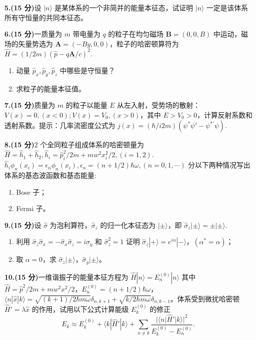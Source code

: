 \textbf{5.(15 分)}设 $|n\rangle$ 是某体系的一个非简并的能量本征态，试证明 $|n\rangle$ 一定是该体系所有守恒量的共同本征态。

\textbf{6.(15 分)}一质量为 $m$ 带电量为 $q$ 的粒子在均匀磁场 $\mathbf{B} = (0,0,B)$ 中运动，磁场的矢量势选为 $\mathbf{A} = (-By,0,0)$，粒子的哈密顿算符为 $\hat{H} = (1/2m)(\hat{p} - q\mathbf{A}/c)^2$.
    \begin{enumerate}
        \item 动量 $\hat{p}_x, \hat{p}_y, \hat{p}_z$ 中哪些是守恒量？
        \item 求粒子的能量本征值。
    \end{enumerate}

\textbf{7.(15 分)}质量为 $m$ 的粒子以能量 $E$ 从左入射，受势场的散射：$V(x) = 0, (x < 0); V(x) = V_0, (x > 0)$，其中 $E > V_0 > 0$，计算反射系数和透射系数。提示：几率流密度公式为 $j(x) = (\hbar/i2m)(\psi^*\psi' - \psi^{*'}\psi)$.

\textbf{8.(15 分)}2 个全同粒子组成体系的哈密顿量为 $\hat{H} = \hat{h}_1 + \hat{h}_2, \hat{h}_i = \hat{p}_i^2/2m + mw^2 x_i^2/2, (i = 1,2)$. $\hat{h}_i \phi_n(x_i) = \epsilon_n \phi_n(x_i), \epsilon_n = (n + 1/2)\hbar \omega, (n = 0,1,\cdots)$ 分以下两种情况写出体系的基态波函数和基态能量: 
    \begin{enumerate}
        \item  Bose 子；
        \item  Fermi 子。
    \end{enumerate}

 \textbf{9.(15 分)}设 $\hat{\sigma}$ 为泡利算符，$\hat{\sigma}_z$ 的归一化本征态为 $| \pm \rangle$，即 $\hat{\sigma}_z | \pm \rangle = \pm | \pm\rangle$.
    \begin{enumerate}
        \item 利用 $\hat{\sigma}_z \hat{\sigma}_x = -\hat{\sigma}_x \hat{\sigma}_z = i \hat{\sigma}_y$ 和 $\hat{\sigma}_z^2 = 1$ 证明 $\hat{\sigma}_z | + \rangle = e^{i \alpha} | - \rangle$，$(\alpha^* = \alpha)$；
        \item 取 $\alpha = 0$，求 $\hat{\sigma}_z | \pm \rangle$，$\hat{\sigma}_y | \pm \rangle$。
    \end{enumerate}   

 \textbf{10.(15 分)}一维谐振子的能量本征方程为 $\hat{H}|n\rangle = E_n^{(0)} |n\rangle$ 其中 $\hat{H} = \hat{p}^2/2m + mw^2 x^2 / 2$，$E_n^{(0)} = (n + 1/2)\hbar \omega$，$\langle n| \hat{x} | k \rangle = \sqrt{(k + 1)/2\hbar m \omega}\delta_{n,k+1} + \sqrt{k/2\hbar m \omega}\delta_{n,k-1}$。体系受到微扰哈密顿 $\hat{H}' = \lambda \hat{x}$ 的作用，试用以下公式计算能级 $E_k^{(0)}$ 的修正
$$E_k \approx E_k^{(0)} + \langle k | \hat{H}' | k \rangle + \sum_{n\neq k} \frac{|\langle n | \hat{H}' | k \rangle |^2}{E_k^{(0)} - E_n^{(0)}}.~$$